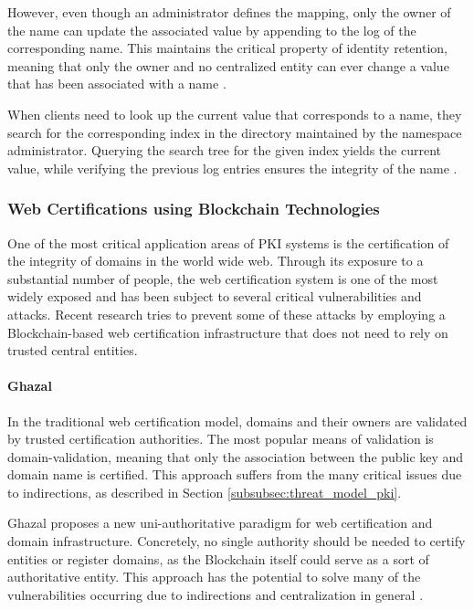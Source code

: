 However, even though an administrator defines the mapping, only the owner of the name can update the associated value by appending to the log of the corresponding name. This maintains the critical property of identity retention, meaning that only the owner and no centralized entity can ever change a value that has been associated with a name \cite{dong_bitforest:_2018}.

When clients need to look up the current value that corresponds to a name, they search for the corresponding index in the directory maintained by the namespace administrator. Querying the search tree for the given index yields the current value, while verifying the previous log entries ensures the integrity of the name \cite{dong_bitforest:_2018}.


\subsubsection{Web Certifications using Blockchain Technologies}

One of the most critical application areas of PKI systems is the certification of the integrity of domains in the world wide web. Through its exposure to a substantial number of people, the web certification system is one of the most widely exposed and has been subject to several critical vulnerabilities and attacks. Recent research tries to prevent some of these attacks by employing a Blockchain-based web certification infrastructure that does not need to rely on trusted central entities.

\paragraph{Ghazal}

In the traditional web certification model, domains and their owners are validated by trusted certification authorities. The most popular means of validation is domain-validation, meaning that only the association between the public key and domain name is certified. This approach suffers from the many critical issues due to indirections, as described in Section \ref{subsubsec:threat_model_pki}.

Ghazal proposes a new uni-authoritative paradigm for web certification and domain infrastructure. Concretely, no single authority should be needed to certify entities or register domains, as the Blockchain itself could serve as a sort of authoritative entity. This approach has the potential to solve many of the vulnerabilities occurring due to indirections and centralization in general \cite{zohar_ghazal:_2019}.

